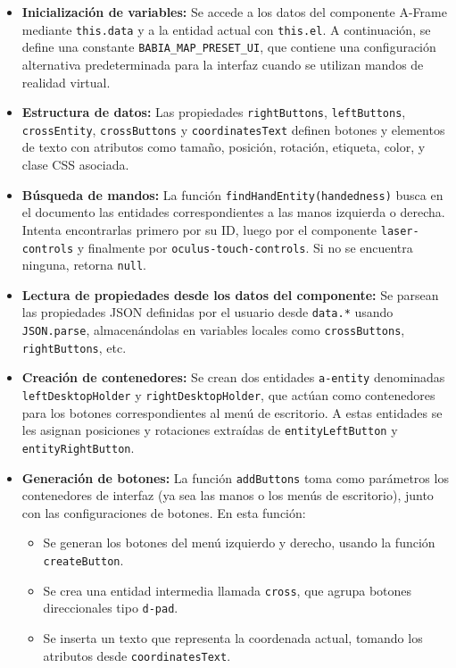 \documentclass[a4paper, 12pt]{book}
\begin{document}
\begin{itemize}
  \item \textbf{Inicialización de variables:} Se accede a los datos del componente A-Frame mediante \texttt{this.data} y a la entidad actual con \texttt{this.el}. A continuación, se define una constante \texttt{BABIA\_MAP\_PRESET\_UI}, que contiene una configuración alternativa predeterminada para la interfaz cuando se utilizan mandos de realidad virtual.

  \item \textbf{Estructura de datos:} Las propiedades \texttt{rightButtons}, \texttt{leftButtons}, \texttt{crossEntity}, \texttt{crossButtons} y \texttt{coordinatesText} definen botones y elementos de texto con atributos como tamaño, posición, rotación, etiqueta, color, y clase CSS asociada.

  \item \textbf{Búsqueda de mandos:} La función \texttt{findHandEntity(handedness)} busca en el documento las entidades correspondientes a las manos izquierda o derecha. Intenta encontrarlas primero por su ID, luego por el componente \texttt{laser-controls} y finalmente por \texttt{oculus-touch-controls}. Si no se encuentra ninguna, retorna \texttt{null}.

  \item \textbf{Lectura de propiedades desde los datos del componente:} Se parsean las propiedades JSON definidas por el usuario desde \texttt{data.*} usando \texttt{JSON.parse}, almacenándolas en variables locales como \texttt{crossButtons}, \texttt{rightButtons}, etc.

  \item \textbf{Creación de contenedores:} Se crean dos entidades \texttt{a-entity} denominadas \texttt{leftDesktopHolder} y \texttt{rightDesktopHolder}, que actúan como contenedores para los botones correspondientes al menú de escritorio. A estas entidades se les asignan posiciones y rotaciones extraídas de \texttt{entityLeftButton} y \texttt{entityRightButton}.

  \item \textbf{Generación de botones:} La función \texttt{addButtons} toma como parámetros los contenedores de interfaz (ya sea las manos o los menús de escritorio), junto con las configuraciones de botones. En esta función:
  \begin{itemize}
    \item Se generan los botones del menú izquierdo y derecho, usando la función \texttt{createButton}.
    \item Se crea una entidad intermedia llamada \texttt{cross}, que agrupa botones direccionales tipo \texttt{d-pad}.
    \item Se inserta un texto que representa la coordenada actual, tomando los atributos desde \texttt{coordinatesText}.
  \end{itemize}


\end{itemize}
\end{document}
